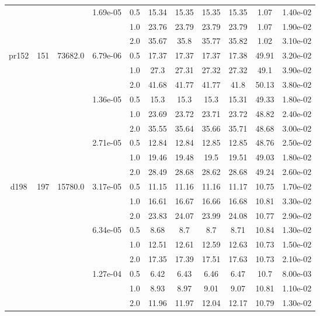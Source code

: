 \begin{table*}[htb!]
\begin{tabular}{|c|c|c|c|c|c|c|c|c|c|c|}
\cline{4-11}
	& & &\multirow{3}{*}{1.69e-05} & 0.5 & 15.34 & 15.35 & 15.35 & 15.35 & 1.07 & 1.40e-02 \\
	& & & & 1.0 & 23.76 & 23.79 & 23.79 & 23.79 & 1.07 & 1.90e-02 \\
	& & & & 2.0 & 35.67 & 35.8 & 35.77 & 35.82 & 1.02 & 3.10e-02 \\

\hline
 	\multirow{9}{*}{pr152} & \multirow{9}{*}{151} & \multirow{9}{*}{73682.0} & \multirow{3}{*}{6.79e-06} & 0.5 & 17.37 & 17.37 & 17.37 & 17.38 & 49.91 & 3.20e-02 \\
	& & & & 1.0 & 27.3 & 27.31 & 27.32 & 27.32 & 49.1 & 3.90e-02 \\
	& & & & 2.0 & 41.68 & 41.77 & 41.77 & 41.8 & 50.13 & 3.80e-02 \\

\cline{4-11}
	& & &\multirow{3}{*}{1.36e-05} & 0.5 & 15.3 & 15.3 & 15.3 & 15.31 & 49.33 & 1.80e-02 \\
	& & & & 1.0 & 23.69 & 23.72 & 23.71 & 23.72 & 48.82 & 2.40e-02 \\
	& & & & 2.0 & 35.55 & 35.64 & 35.66 & 35.71 & 48.68 & 3.00e-02 \\

\cline{4-11}
	& & &\multirow{3}{*}{2.71e-05} & 0.5 & 12.84 & 12.84 & 12.85 & 12.85 & 48.76 & 2.50e-02 \\
	& & & & 1.0 & 19.46 & 19.48 & 19.5 & 19.51 & 49.03 & 1.80e-02 \\
	& & & & 2.0 & 28.49 & 28.68 & 28.62 & 28.68 & 49.24 & 2.60e-02 \\

\hline
 	\multirow{9}{*}{d198} & \multirow{9}{*}{197} & \multirow{9}{*}{15780.0} & \multirow{3}{*}{3.17e-05} & 0.5 & 11.15 & 11.16 & 11.16 & 11.17 & 10.75 & 1.70e-02 \\
	& & & & 1.0 & 16.61 & 16.67 & 16.66 & 16.68 & 10.81 & 3.30e-02 \\
	& & & & 2.0 & 23.83 & 24.07 & 23.99 & 24.08 & 10.77 & 2.90e-02 \\

\cline{4-11}
	& & &\multirow{3}{*}{6.34e-05} & 0.5 & 8.68 & 8.7 & 8.7 & 8.71 & 10.84 & 1.30e-02 \\
	& & & & 1.0 & 12.51 & 12.61 & 12.59 & 12.63 & 10.73 & 1.50e-02 \\
	& & & & 2.0 & 17.35 & 17.39 & 17.51 & 17.63 & 10.73 & 2.10e-02 \\

\cline{4-11}
	& & &\multirow{3}{*}{1.27e-04} & 0.5 & 6.42 & 6.43 & 6.46 & 6.47 & 10.7 & 8.00e-03 \\
	& & & & 1.0 & 8.93 & 8.97 & 9.01 & 9.07 & 10.81 & 1.10e-02 \\
	& & & & 2.0 & 11.96 & 11.97 & 12.04 & 12.17 & 10.79 & 1.30e-02 \\


\end{tabular}
\end{table*}
